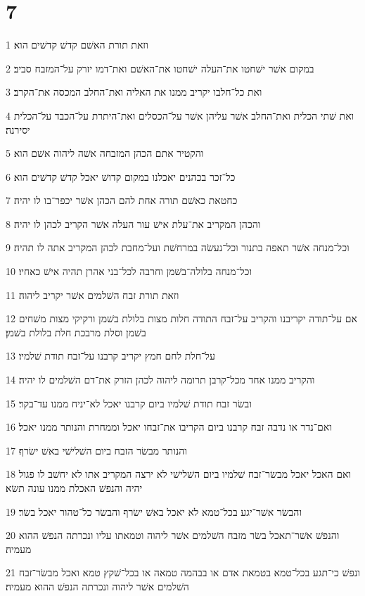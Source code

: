 \chapter{7}

\par 1 וזאת תורת האשׁם קדשׁ קדשׁים הוא׃
\par 2 במקום אשׁר ישׁחטו את־העלה ישׁחטו את־האשׁם ואת־דמו יזרק על־המזבח סביב׃
\par 3 ואת כל־חלבו יקריב ממנו את האליה ואת־החלב המכסה את־הקרב׃
\par 4 ואת שׁתי הכלית ואת־החלב אשׁר עליהן אשׁר על־הכסלים ואת־היתרת על־הכבד על־הכלית יסירנה׃
\par 5 והקטיר אתם הכהן המזבחה אשׁה ליהוה אשׁם הוא׃
\par 6 כל־זכר בכהנים יאכלנו במקום קדושׁ יאכל קדשׁ קדשׁים הוא׃
\par 7 כחטאת כאשׁם תורה אחת להם הכהן אשׁר יכפר־בו לו יהיה׃
\par 8 והכהן המקריב את־עלת אישׁ עור העלה אשׁר הקריב לכהן לו יהיה׃
\par 9 וכל־מנחה אשׁר תאפה בתנור וכל־נעשׂה במרחשׁת ועל־מחבת לכהן המקריב אתה לו תהיה׃
\par 10 וכל־מנחה בלולה־בשׁמן וחרבה לכל־בני אהרן תהיה אישׁ כאחיו׃
\par 11 וזאת תורת זבח השׁלמים אשׁר יקריב ליהוה׃
\par 12 אם על־תודה יקריבנו והקריב על־זבח התודה חלות מצות בלולת בשׁמן ורקיקי מצות משׁחים בשׁמן וסלת מרבכת חלת בלולת בשׁמן׃
\par 13 על־חלת לחם חמץ יקריב קרבנו על־זבח תודת שׁלמיו׃
\par 14 והקריב ממנו אחד מכל־קרבן תרומה ליהוה לכהן הזרק את־דם השׁלמים לו יהיה׃
\par 15 ובשׂר זבח תודת שׁלמיו ביום קרבנו יאכל לא־יניח ממנו עד־בקר׃
\par 16 ואם־נדר או נדבה זבח קרבנו ביום הקריבו את־זבחו יאכל וממחרת והנותר ממנו יאכל׃
\par 17 והנותר מבשׂר הזבח ביום השׁלישׁי באשׁ ישׂרף׃
\par 18 ואם האכל יאכל מבשׂר־זבח שׁלמיו ביום השׁלישׁי לא ירצה המקריב אתו לא יחשׁב לו פגול יהיה והנפשׁ האכלת ממנו עונה תשׂא׃
\par 19 והבשׂר אשׁר־יגע בכל־טמא לא יאכל באשׁ ישׂרף והבשׂר כל־טהור יאכל בשׂר׃
\par 20 והנפשׁ אשׁר־תאכל בשׂר מזבח השׁלמים אשׁר ליהוה וטמאתו עליו ונכרתה הנפשׁ ההוא מעמיה׃
\par 21 ונפשׁ כי־תגע בכל־טמא בטמאת אדם או בבהמה טמאה או בכל־שׁקץ טמא ואכל מבשׂר־זבח השׁלמים אשׁר ליהוה ונכרתה הנפשׁ ההוא מעמיה׃
